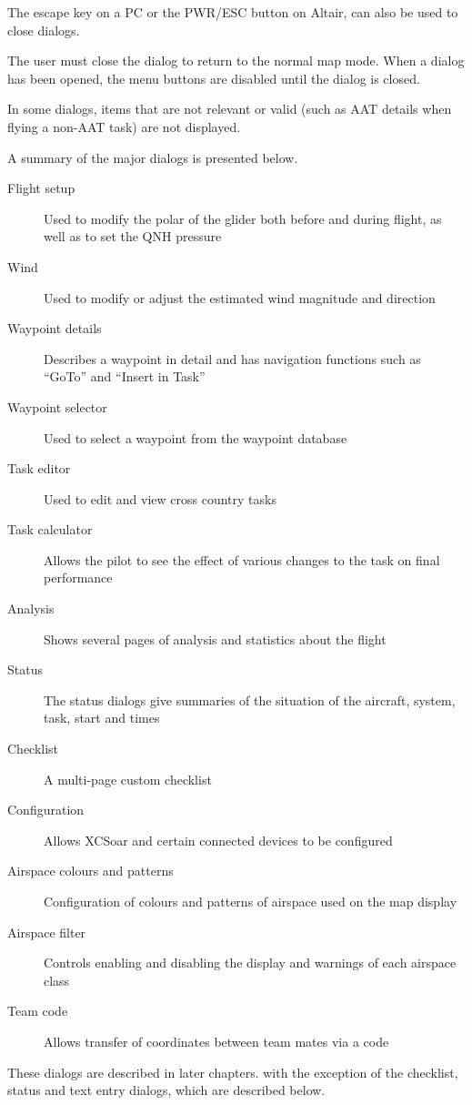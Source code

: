 \documentclass[a4paper,12pt]{refrep}
\begin{document}
The escape key on a PC or the PWR/ESC button on Altair, can also be used to
close dialogs.

The user must close the dialog to return to the normal map mode. When a dialog
has been opened, the menu buttons are disabled until the dialog is closed.

In some dialogs, items that are not relevant or valid (such as AAT details when
flying a non-AAT task) are not displayed.

 A summary of the
major dialogs is presented below.
\begin{description}
\item[Flight setup] Used to modify the polar of the glider both before and
during flight, as well as to set the QNH pressure
\item[Wind] Used to modify or adjust the estimated wind magnitude and direction
\item[Waypoint details] Describes a waypoint in detail and has navigation
functions such as ``GoTo'' and ``Insert in Task''
\item[Waypoint selector] Used to select a waypoint from the waypoint database
\item[Task editor] Used to edit and view cross country tasks
\item[Task calculator] Allows the pilot to see the effect of various changes to
the task on final performance
\item[Analysis] Shows several pages of analysis and statistics about the flight
\item[Status] The status dialogs give summaries of the situation of the 
aircraft, system, task, start and times
\item[Checklist] A multi-page custom checklist
\item[Configuration] Allows XCSoar and certain connected devices to be
configured
\item[Airspace colours and patterns] Configuration of colours and patterns of
airspace used on the map display
\item[Airspace filter] Controls enabling and disabling the display and warnings
of each airspace class
\item[Team code] Allows transfer of coordinates between team mates via a code
\end{description}

These dialogs are described in later chapters. with the exception of the
checklist, status and text entry dialogs, which are described below.
\end{document}
